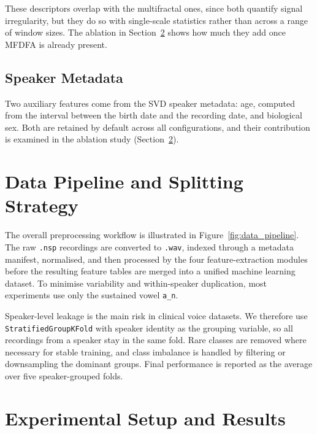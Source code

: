\documentclass[runningheads]{llncs}
\begin{document}
  These descriptors overlap with the multifractal ones, since both quantify signal irregularity, but they do so with single-scale statistics rather than across a range of window sizes. The ablation in Section~\ref{sec:experiments} shows how much they add once MFDFA is already present.

  \subsection{Speaker Metadata}

  Two auxiliary features come from the SVD speaker metadata: age, computed from the interval between the birth date and the recording date, and biological sex. Both are retained by default across all configurations, and their contribution is examined in the ablation study (Section~\ref{sec:experiments}).

  \section{Data Pipeline and Splitting Strategy}
  \label{sec:pipeline}

  The overall preprocessing workflow is illustrated in Figure~\ref{fig:data_pipeline}.
  The raw \texttt{.nsp} recordings are converted to \texttt{.wav}, indexed through a metadata manifest, normalised, and then processed by the four feature-extraction modules before the resulting feature tables are merged into a unified machine learning dataset. To minimise variability and within-speaker duplication, most experiments use only the sustained vowel \texttt{a\_n}.

  Speaker-level leakage is the main risk in clinical voice datasets. We therefore use \texttt{StratifiedGroupKFold} with speaker identity as the grouping variable, so all recordings from a speaker stay in the same fold. Rare classes are removed where necessary for stable training, and class imbalance is handled by filtering or downsampling the dominant groups. Final performance is reported as the average over five speaker-grouped folds.
  \section{Experimental Setup and Results}
  \label{sec:experiments}
\end{document}

